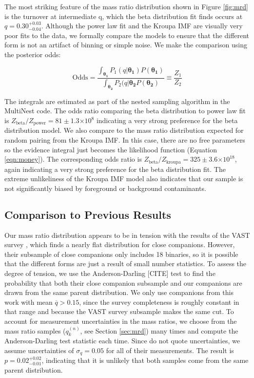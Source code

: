 \documentclass{emulateapj}
\providecommand{\e}[1]{\ensuremath{\times 10^{#1}}}
\renewcommand{\vec}[1]{\bm{#1}}
\begin{document}
The most striking feature of the mass ratio distribution shown in Figure \ref{fig:mrd} is the turnover at intermediate q, which the beta distribution fit finds occurs at $q = 0.30^{+0.03}_{-0.04}$. Although the power law fit and the Kroupa IMF are visually very poor fits to the data, we formally compare the models to ensure that the different form is not an artifact of binning or simple noise. We make the comparison using the posterior odds:

\begin{equation}
\mathrm{Odds} = \frac{\int_{\vec{\theta_1}} P_1(q|\vec{\theta_1}) P(\vec{\theta_1})}{\int_{\vec{\theta_2}} P_2(q|\vec{\theta_2}  P(\vec{\theta_2})} \equiv \frac{Z_1}{Z_2}
\end{equation}

The integrals are estimated as part of the nested sampling algorithm in the MultiNest code. The odds ratio comparing the beta distribution to power law fit is $Z_\mathrm{beta} / Z_\mathrm{power} = 81 \pm 1.3 \e{8}$ indicating a very strong preference for the beta distribution model. We also compare to the mass ratio distribution expected for random pairing from the Kroupa IMF. In this case, there are no free parameters so the evidence integral just becomes the likelihood function (Equation \ref{eqn:money}). The corresponding odds ratio is  $Z_\mathrm{beta} / Z_\mathrm{kroupa} = 325 \pm 3.6 \e{18}$, again indicating a very strong preference for the beta distribution fit. The extreme unlikeliness of the Kroupa IMF model also indicates that our sample is not significantly biased by foreground or background contaminants.


\subsection{Comparison to Previous Results}

Our mass ratio distribution appears to be in tension with the results of the VAST survey \citep{DeRosa2014}, which finds a nearly flat distribution for close companions. However, their subsample of close companions only includes 18 binaries, so it is possible that the different forms are just a result of small number statistics. To assess the degree of tension, we use the Anderson-Darling [CITE] test to find the probability that both their close companion subsample and our companions are drawn from the same parent distribution. We only use companions from this work with mean $\overline{q} > 0.15$, since the survey completeness is roughly constant in that range and because the VAST survey subsample makes the same cut. To account for measurement uncertainties in the mass ratios, we choose from the mass ratio samples ($q_k^{(n)}$, see Section \ref{sec:mrd}) many times and compute the Anderson-Darling test statistic each time. Since \citet{DeRosa2014} do not quote uncertainties, we assume uncertainties of $\sigma_q = 0.05$ for all of their measurements. The result is $p = 0.02^{+0.02}_{-0.01}$, indicating that it is unlikely that both samples come from the same parent distribution.
\end{document}
